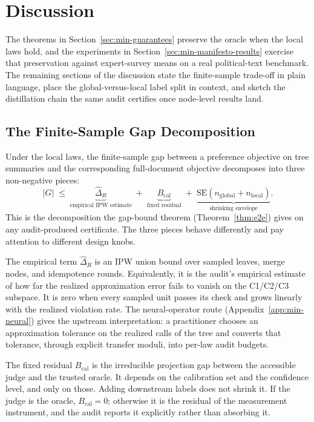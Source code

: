 \section{Discussion}\label{sec:min-discussion}

The theorems in Section~\ref{sec:min-guarantees} preserve the oracle when
the local laws hold, and the experiments in
Section~\ref{sec:min-manifesto-results} exercise that preservation against
expert-survey means on a real political-text benchmark. The remaining
sections of the discussion state the finite-sample trade-off in plain
language, place the global-versus-local label split in context, and sketch
the distillation chain the same audit certifies once node-level results land.

\subsection{The Finite-Sample Gap Decomposition}\label{sec:min-tradeoff}

Under the local laws, the finite-sample gap between a preference objective
on tree summaries and the corresponding full-document objective decomposes
into three non-negative pieces:
\begin{equation}\label{eq:min-discussion-bound}
|G|
\;\le\;
\underbrace{\hat{\Delta}_R}_{\text{empirical IPW estimate}}
\;+\;
\underbrace{B_{\mathrm{cal}}}_{\text{fixed residual}}
\;+\;
\underbrace{\text{SE}(n_{\mathrm{global}} + n_{\mathrm{local}})}_{\text{shrinking envelope}}.
\end{equation}
This is the decomposition the gap-bound theorem
(Theorem~\ref{thm:e2e}) gives on any audit-produced certificate. The three
pieces behave differently and pay attention to different design knobs.

The empirical term $\hat{\Delta}_R$ is an IPW union bound over sampled
leaves, merge nodes, and idempotence rounds. Equivalently, it is the
audit's empirical estimate of how far the realized approximation error
fails to vanish on the C1/C2/C3 subspace. It is zero when every sampled
unit passes its check and grows linearly with the realized violation rate.
The neural-operator route (Appendix~\ref{app:min-neural}) gives the
upstream interpretation: a practitioner chooses an approximation tolerance
on the realized calls of the tree and converts that tolerance, through
explicit transfer moduli, into per-law audit budgets.

The fixed residual $B_{\mathrm{cal}}$ is the irreducible projection gap
between the accessible judge and the trusted oracle. It depends on the
calibration set and the confidence level, and only on those. Adding
downstream labels does not shrink it. If the judge is the oracle,
$B_{\mathrm{cal}} = 0$; otherwise it is the residual of the measurement
instrument, and the audit reports it explicitly rather than absorbing it.

